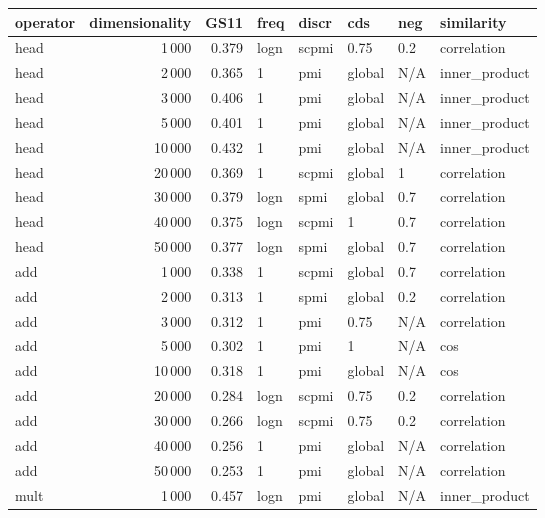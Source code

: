 \begin{tabular}{lrrlllll}
\toprule
operator &  dimensionality &   GS11 &  freq &  discr &     cds &  neg &     similarity \\
\midrule
    head &            1\,000 &  0.379 &  logn &  scpmi &    0.75 &  0.2 &    correlation \\
    head &            2\,000 &  0.365 &     1 &    pmi &  global &  N/A &  inner\_product \\
    head &            3\,000 &  0.406 &     1 &    pmi &  global &  N/A &  inner\_product \\
    head &            5\,000 &  0.401 &     1 &    pmi &  global &  N/A &  inner\_product \\
    head &           10\,000 &  0.432 &     1 &    pmi &  global &  N/A &  inner\_product \\
    head &           20\,000 &  0.369 &     1 &  scpmi &  global &    1 &    correlation \\
    head &           30\,000 &  0.379 &  logn &   spmi &  global &  0.7 &    correlation \\
    head &           40\,000 &  0.375 &  logn &  scpmi &       1 &  0.7 &    correlation \\
    head &           50\,000 &  0.377 &  logn &   spmi &  global &  0.7 &    correlation \\
     add &            1\,000 &  0.338 &     1 &  scpmi &  global &  0.7 &    correlation \\
     add &            2\,000 &  0.313 &     1 &   spmi &  global &  0.2 &    correlation \\
     add &            3\,000 &  0.312 &     1 &    pmi &    0.75 &  N/A &    correlation \\
     add &            5\,000 &  0.302 &     1 &    pmi &       1 &  N/A &            cos \\
     add &           10\,000 &  0.318 &     1 &    pmi &  global &  N/A &            cos \\
     add &           20\,000 &  0.284 &  logn &  scpmi &    0.75 &  0.2 &    correlation \\
     add &           30\,000 &  0.266 &  logn &  scpmi &    0.75 &  0.2 &    correlation \\
     add &           40\,000 &  0.256 &     1 &    pmi &  global &  N/A &    correlation \\
     add &           50\,000 &  0.253 &     1 &    pmi &  global &  N/A &    correlation \\
    mult &            1\,000 &  0.457 &  logn &    pmi &  global &  N/A &  inner\_product \\

\end{tabular}
